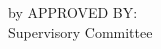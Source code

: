\newpage

{
\centering
\thesistitle
\tpbreak
by
\tpbreak
\nameanddegrees
\tpbreak
APPROVED BY: \\

\newcommand\panelist[3]{\noindent #1, #2\\\noindent(#3)\tpbreak}
\vfill
\noindent Supervisory Committee
\tpbreak
\panel
\vfill
}
\pagebreak
